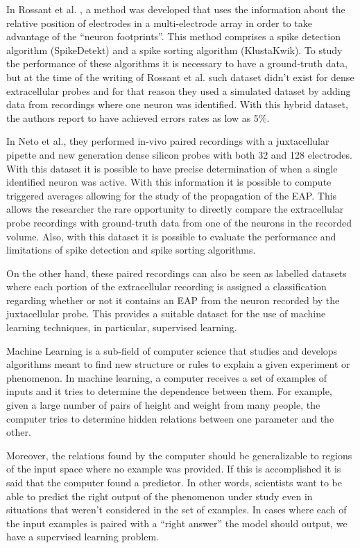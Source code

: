 In Rossant et al. \cite{Rossant2016}, a method was developed that uses the information about the relative position of electrodes in a multi-electrode array in order to take advantage of the “neuron footprints”. This method comprises a spike detection algorithm (SpikeDetekt) and a spike sorting algorithm (KlustaKwik). To study the performance of these algorithms it is necessary to have a ground-truth data, but at the time of the writing of Rossant et al. such dataset didn't exist for dense extracellular probes and for that reason they used a simulated dataset by adding data from recordings where one neuron was identified. With this hybrid dataset, the authors report to have achieved errors rates as low as 5\%.

In Neto et al., they performed in-vivo paired recordings with a juxtacellular pipette and new generation dense silicon probes with both 32 and 128 electrodes. With this dataset it is possible to have precise determination of when a single identified neuron was active. With this information it is possible to compute triggered averages allowing for the study of the propagation of the EAP. This allows the researcher the rare opportunity to directly compare the extracellular probe recordings with ground-truth data from one of the neurons in the recorded volume. Also, with this dataset it is possible to evaluate the performance and limitations of spike detection and spike sorting algorithms.

On the other hand, these paired recordings can also be seen as labelled datasets where each portion of the extracellular recording is assigned a classification regarding whether or not it contains an EAP from the neuron recorded by the juxtacellular probe. This provides a suitable dataset for the use of machine learning techniques, in particular, supervised learning.

Machine Learning is a sub-field of computer science that studies and develops algorithms meant to find new structure or rules to explain a given experiment or phenomenon. In machine learning, a computer receives a set of examples of inputs and it tries to determine the dependence between them. For example, given a large number of pairs of height and weight from many people, the computer tries to determine hidden relations between one parameter and the other.
 
Moreover, the relations found by the computer should be generalizable to regions of the input space where no example was provided. If this is accomplished it is said that the computer found a predictor. In other words, scientists want to be able to predict the right output of the phenomenon under study even in situations that weren't considered in the set of examples. 
In cases where each of the input examples is paired with a “right answer” the model should output, we have a supervised learning problem.

